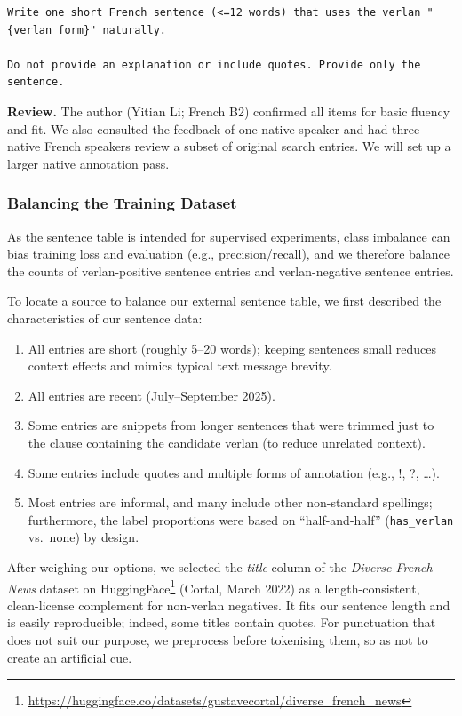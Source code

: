 \documentclass[12pt]{article}
\begin{document}
\begin{lstlisting}
Write one short French sentence (<=12 words) that uses the verlan "{verlan_form}" naturally.

Do not provide an explanation or include quotes. Provide only the sentence.
\end{lstlisting}

\textbf{Review.} The author (Yitian Li; French B2) confirmed all items for basic fluency and fit. We also consulted the feedback of one native speaker and had three native French speakers review a subset of original search entries. We will set up a larger native annotation pass.

\subsubsection{Balancing the Training Dataset}

As the sentence table is intended for supervised experiments, class imbalance can bias training loss and evaluation (e.g., precision/recall), and we therefore balance the counts of verlan-positive sentence entries and verlan-negative sentence entries.

To locate a source to balance our external sentence table, we first described the characteristics of our sentence data:
\begin{enumerate}
  \item All entries are short (roughly 5--20 words); keeping sentences small reduces context effects and mimics typical text message brevity.
  \item All entries are recent (July--September 2025).
  \item Some entries are snippets from longer sentences that were trimmed just to the clause containing the candidate verlan (to reduce unrelated context).
  \item Some entries include quotes and multiple forms of annotation (e.g., !, ?, \ldots).
  \item Most entries are informal, and many include other non-standard spellings; furthermore, the label proportions were based on ``half-and-half'' (\texttt{has\_verlan} vs.\ none) by design.
\end{enumerate}

After weighing our options, we selected the \textit{title} column of the \textit{Diverse French News} dataset on HuggingFace\footnote{\url{https://huggingface.co/datasets/gustavecortal/diverse_french_news}} (Cortal, March 2022) as a length-consistent, clean-license complement for non-verlan negatives. It fits our sentence length and is easily reproducible; indeed, some titles contain quotes. For punctuation that does not suit our purpose, we preprocess before tokenising them, so as not to create an artificial cue.
\end{document}
